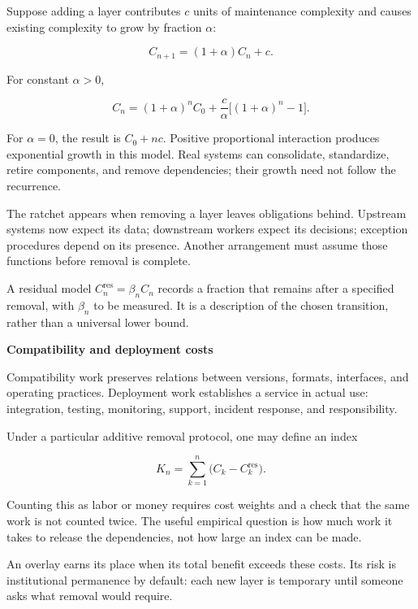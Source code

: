 \documentclass[11pt,openany]{book}
\newcommand{\subhead}[1]{\par\medskip\noindent\textbf{#1}\par\nobreak\smallskip}
\begin{document}
Suppose adding a layer contributes $c$ units of maintenance complexity and causes existing complexity to grow by fraction $\alpha$:

\begin{equation}
C_{n+1}=(1+\alpha)C_n+c.
\label{eq:ratchet-recursion}
\end{equation}

For constant $\alpha>0$,

\begin{equation}
C_n=(1+\alpha)^nC_0+
\frac{c}{\alpha}\big[(1+\alpha)^n-1\big].
\label{eq:ratchet-floor}
\end{equation}

For $\alpha=0$, the result is $C_0+nc$. Positive proportional interaction produces exponential growth in this model. Real systems can consolidate, standardize, retire components, and remove dependencies; their growth need not follow the recurrence.

The ratchet appears when removing a layer leaves obligations behind. Upstream systems now expect its data; downstream workers expect its decisions; exception procedures depend on its presence. Another arrangement must assume those functions before removal is complete.

A residual model $C_n^{\mathrm{res}}=\beta_n C_n$ records a fraction that remains after a specified removal, with $\beta_n$ to be measured. It is a description of the chosen transition, rather than a universal lower bound.

\subhead{Compatibility and deployment costs}

Compatibility work preserves relations between versions, formats, interfaces, and operating practices. Deployment work establishes a service in actual use: integration, testing, monitoring, support, incident response, and responsibility.

Under a particular additive removal protocol, one may define an index

\begin{equation}
K_n=\sum_{k=1}^n\big(C_k-C_k^{\mathrm{res}}\big).
\label{eq:compat-tax}
\end{equation}

Counting this as labor or money requires cost weights and a check that the same work is not counted twice. The useful empirical question is how much work it takes to release the dependencies, not how large an index can be made.

An overlay earns its place when its total benefit exceeds these costs. Its risk is institutional permanence by default: each new layer is temporary until someone asks what removal would require.
\end{document}
